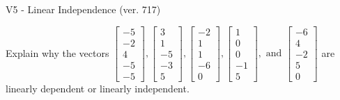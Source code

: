 \begin{exercise}
  \begin{exerciseTitle}V5 - Linear Independence (ver. 717)\end{exerciseTitle}
  \begin{exerciseStatement}
    Explain why the vectors \(\left[\begin{array}{r}
-5 \\
-2 \\
4 \\
-5 \\
-5
\end{array}\right] , \left[\begin{array}{r}
3 \\
1 \\
-5 \\
-3 \\
5
\end{array}\right] , \left[\begin{array}{r}
-2 \\
1 \\
1 \\
-6 \\
0
\end{array}\right] , \left[\begin{array}{r}
1 \\
0 \\
0 \\
-1 \\
5
\end{array}\right] , \text{ and } \left[\begin{array}{r}
-6 \\
4 \\
-2 \\
5 \\
0
\end{array}\right]\) are linearly dependent or linearly independent.	



\end{exerciseStatement}
\end{exercise}
